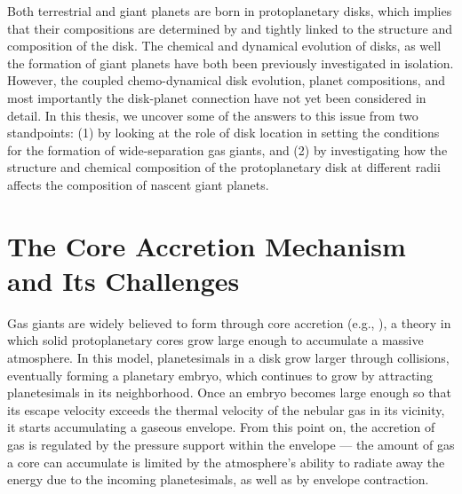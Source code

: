 Both terrestrial and giant planets are born in protoplanetary disks, which implies that
their compositions are determined by and tightly linked to the structure and
composition of the disk. The chemical and dynamical evolution of disks, as well the
formation of giant planets have both been previously investigated in isolation. However, the
coupled chemo-dynamical disk evolution, planet compositions, and most importantly the
disk-planet connection have not yet been considered in detail. In this thesis, we uncover some of the answers to this issue from two standpoints: (1) by looking at the role of disk location in setting the conditions for the formation of wide-separation gas giants, and (2) by investigating how the structure and chemical composition of the protoplanetary disk at different radii affects the composition of nascent giant planets.


\section{The Core Accretion Mechanism and Its Challenges}

Gas giants are widely believed to form through core accretion (e.g., \citealt{pollack96}), a theory in which
solid protoplanetary cores grow large enough to accumulate a massive atmosphere. In this
model, planetesimals in a disk grow larger through collisions, eventually forming a planetary
embryo, which continues to grow by attracting planetesimals in its neighborhood. Once an
embryo becomes large enough so that its escape velocity exceeds the thermal velocity of the
nebular gas in its vicinity, it starts accumulating a gaseous envelope. From this point on, the
accretion of gas is regulated by the pressure support within the envelope --- the amount of
gas a core can accumulate is limited by the atmosphere's ability to radiate away the energy
due to the incoming planetesimals, as well as by envelope contraction.

